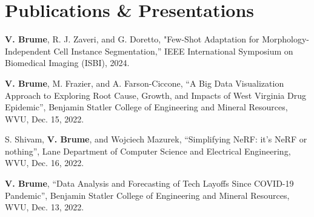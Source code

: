 \documentclass[letterpaper,11pt]{article}
\newcommand{\resumeSubHeadingListStart}{\begin{itemize}[leftmargin=0.15in, label={}]}
\newcommand{\resumeSubHeadingListEnd}{\end{itemize}}
\begin{document}
\section{Publications \& Presentations}
  \vspace{2pt}
  \resumeSubHeadingListStart
    \small{\item{
        \textbf{V. Brume}{, R. J. Zaveri, and G. Doretto, "Few-Shot Adaptation for Morphology-Independent Cell Instance Segmentation,” IEEE International Symposium on Biomedical Imaging (ISBI), 2024.} \\ \vspace{3pt}

        \textbf{V. Brume}{, M. Frazier, and A. Farson-Ciccone, “A Big Data Visualization Approach to Exploring Root Cause, Growth, and Impacts of West Virginia Drug Epidemic”, Benjamin Statler College of Engineering and Mineral Resources, WVU, Dec. 15, 2022.} \\ \vspace{3pt}
    
        {S. Shivam, \textbf{V. Brume}, and Wojciech Mazurek, “Simplifying NeRF: it’s NeRF or nothing”, Lane Department of Computer Science and Electrical Engineering, WVU, Dec. 16, 2022.} \\ \vspace{3pt}
        
        \textbf{V. Brume}{, “Data Analysis and Forecasting of Tech Layoffs Since COVID-19 Pandemic”, Benjamin Statler College of Engineering and Mineral Resources, WVU, Dec. 13, 2022.} \\ \vspace{3pt}
    }}
  \resumeSubHeadingListEnd







        
\end{document}
